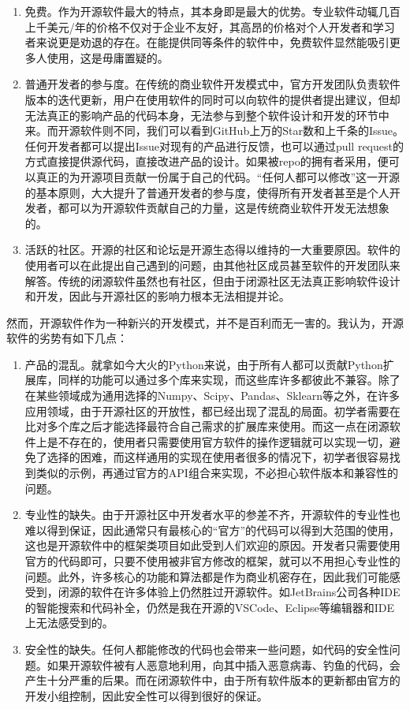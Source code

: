 \documentclass[UTF8]{ctexart}
\begin{document}
\begin{enumerate}
    \item 免费。作为开源软件最大的特点，其本身即是最大的优势。专业软件动辄几百上千美元/年的价格不仅对于企业不友好，其高昂的价格对个人开发者和学习者来说更是劝退的存在。在能提供同等条件的软件中，免费软件显然能吸引更多人使用，这是毋庸置疑的。
    \item 普通开发者的参与度。在传统的商业软件开发模式中，官方开发团队负责软件版本的迭代更新，用户在使用软件的同时可以向软件的提供者提出建议，但却无法真正的影响产品的代码本身，无法参与到整个软件设计和开发的环节中来。而开源软件则不同，我们可以看到GitHub上万的Star数和上千条的Issue。任何开发者都可以提出Issue对现有的产品进行反馈，也可以通过pull request的方式直接提供源代码，直接改进产品的设计。如果被repo的拥有者采用，便可以真正的为开源项目贡献一份属于自己的代码。“任何人都可以修改”这一开源的基本原则，大大提升了普通开发者的参与度，使得所有开发者甚至是个人开发者，都可以为开源软件贡献自己的力量，这是传统商业软件开发无法想象的。
    \item 活跃的社区。开源的社区和论坛是开源生态得以维持的一大重要原因。软件的使用者可以在此提出自己遇到的问题，由其他社区成员甚至软件的开发团队来解答。传统的闭源软件虽然也有社区，但由于闭源社区无法真正影响软件设计和开发，因此与开源社区的影响力根本无法相提并论。
\end{enumerate}

然而，开源软件作为一种新兴的开发模式，并不是百利而无一害的。我认为，开源软件的劣势有如下几点：

\begin{enumerate}
    \item 产品的混乱。就拿如今大火的Python来说，由于所有人都可以贡献Python扩展库，同样的功能可以通过多个库来实现，而这些库许多都彼此不兼容。除了在某些领域成为通用选择的Numpy、Scipy、Pandas、Sklearn等之外，在许多应用领域，由于开源社区的开放性，都已经出现了混乱的局面。初学者需要在比对多个库之后才能选择最符合自己需求的扩展库来使用。而这一点在闭源软件上是不存在的，使用者只需要使用官方软件的操作逻辑就可以实现一切，避免了选择的困难，而这样通用的实现在使用者很多的情况下，初学者很容易找到类似的示例，再通过官方的API组合来实现，不必担心软件版本和兼容性的问题。
    \item 专业性的缺失。由于开源社区中开发者水平的参差不齐，开源软件的专业性也难以得到保证，因此通常只有最核心的“官方”的代码可以得到大范围的使用，这也是开源软件中的框架类项目如此受到人们欢迎的原因。开发者只需要使用官方的代码即可，只要不使用被非官方修改的框架，就可以不用担心专业性的问题。此外，许多核心的功能和算法都是作为商业机密存在，因此我们可能感受到，闭源的软件在许多体验上仍然胜过开源软件。如JetBrains公司各种IDE的智能搜索和代码补全，仍然是我在开源的VSCode、Eclipse等编辑器和IDE上无法感受到的。
    \item 安全性的缺失。任何人都能修改的代码也会带来一些问题，如代码的安全性问题。如果开源软件被有人恶意地利用，向其中插入恶意病毒、钓鱼的代码，会产生十分严重的后果。而在闭源软件中，由于所有软件版本的更新都由官方的开发小组控制，因此安全性可以得到很好的保证。
\end{enumerate}
\end{document}
